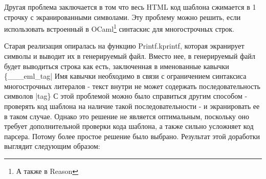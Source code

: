 Другая проблема заключается в том что весь HTML код шаблона сжимается в 1 строчку с экранированными символами.
Эту проблему можно решить, если использовать встроенный в OCaml\footnote{А также в Reason} синтаскис для многострочных строк.

Старая реализация опиралась на функцию Printf.kprintf, которая экранирует символы и выводит их в генерируемый файл.%
Вместо нее, в генерируемый файл будет выводиться строка как есть, заключенная в именованные кавычки
\{\_\_\_eml\_tag| %
Имя кавычки необходимо в связи с ограничением синтаксиса многострочных литералов - текст внутри не может содержать последовательность символов |tag\} %
С этой проблемой можно было справиться другим способом - проверять код шаблона на наличие такой последовательности - и экранировать ее в таком случае.
Однако это решение не является оптимальным, поскольку оно требует дополнительной проверки кода шаблона, а также сильно усложняет код парсера. %
Потому более простое решение было выбрано.
Результат этой доработки выглядит следующим образом:

